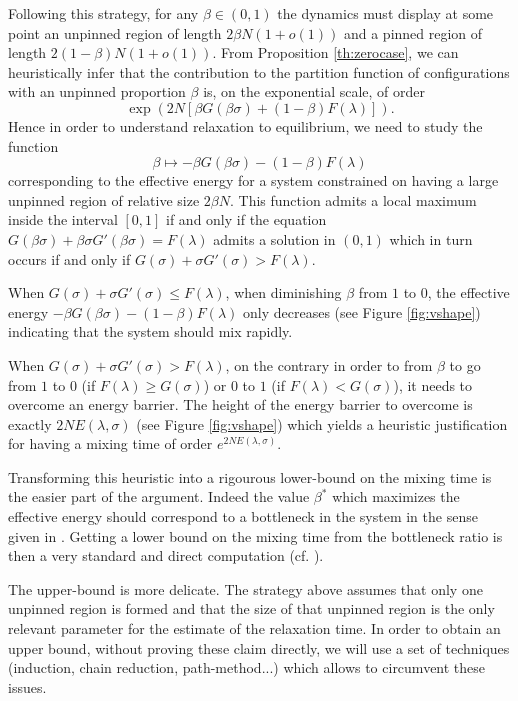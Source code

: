 \documentclass[reqno,11pt]{amsart}
\numberwithin{equation}{section}
\newcommand{\gl}{\lambda}
\begin{document}
Following this strategy,  for any $\beta\in (0,1)$ the dynamics must  display at some point  
an unpinned region of length $2\beta N(1+o(1))$ and a pinned region of length $2(1-\beta)N(1+o(1))$.
From Proposition \ref{th:zerocase}, we can heuristically infer that the contribution to the partition function of configurations with an unpinned proportion $\beta$ is, on the exponential scale, of order
$$\exp\left(2N [ \beta G(\beta \sigma)+ (1-\beta)F(\gl)] \right).$$
Hence in order to understand relaxation to equilibrium, we need to study the function 
$$\beta \mapsto -\beta G(\beta \sigma)-(1-\beta)F(\gl)$$ 
corresponding to the effective energy for a system constrained on having a large unpinned region of relative size $2\beta N$.
This function admits a local maximum inside the interval $[0,1]$ if and only if the equation
$ G(\beta \sigma)+ \beta \sigma G'(\beta \sigma)= F(\gl)$
admits a solution in $(0,1)$ which in turn occurs if and only if $G( \sigma)+ \sigma G'(\sigma)> F(\gl)$.



\medskip

When $G( \sigma)+ \sigma G'(\sigma)\le  F(\gl)$, when diminishing $\beta$ from $1$ to $0$,
 the effective energy $-\beta G(\beta \sigma)- (1-\beta)F(\gl)$ only decreases  (see Figure  \ref{fig:vshape}) indicating that the system should mix rapidly.
 
 \medskip
 
When $G( \sigma)+ \sigma G'(\sigma)> F(\gl)$, on the contrary in order to from $\beta$ to go from $1$ to $0$ (if $F(\gl) \geq G(\sigma)$) or $0$ to $1$ (if $F(\gl)<G(\sigma)$), it needs to overcome an energy barrier.
The height of the energy barrier to overcome is exactly $2 NE(\gl,\sigma)$ (see Figure  \ref{fig:vshape}) which yields a heuristic justification for having a mixing time of order $e^{2N E(\gl,\sigma)}$.

\medskip

Transforming this heuristic into a rigourous lower-bound on the mixing time is the easier part of the argument. Indeed the value $\beta^*$ which maximizes the effective energy should correspond to a bottleneck in the system in the sense given in \cite[Section 7.2]{LPWMCMT}.
Getting a lower bound on the mixing time from the bottleneck ratio is then a very standard and direct computation (cf. \cite[Theorem 7.4]{LPWMCMT}). 

\medskip

The upper-bound is more delicate. The strategy above assumes that only one unpinned region is formed and that the size of that unpinned region is the only relevant parameter for the estimate of the relaxation time. 
In order to obtain an upper bound, without proving these claim directly, we will use a set of techniques (induction, chain reduction, path-method...) which allows to circumvent these issues.
\end{document}
